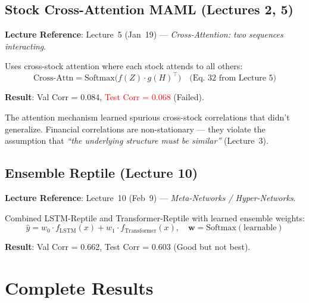 \documentclass[11pt,a4paper]{article}
\begin{document}
\subsection{Stock Cross-Attention MAML \textnormal{(Lectures 2, 5)}}

\textbf{Lecture Reference}: Lecture~5 (Jan~19) --- \emph{Cross-Attention: two sequences interacting}.

Uses cross-stock attention where each stock attends to all others:
\begin{equation}
    \text{Cross-Attn} = \text{Softmax}\bigl(f(Z) \cdot g(H)^\top\bigr) \quad \text{(Eq.~32 from Lecture~5)}
\end{equation}

\textbf{Result}: Val Corr = 0.084, \textcolor{red}{Test Corr = 0.068} (Failed).

The attention mechanism learned spurious cross-stock correlations that didn't generalize. Financial correlations are non-stationary --- they violate the assumption that \emph{``the underlying structure must be similar''} (Lecture~3).

\subsection{Ensemble Reptile \textnormal{(Lecture 10)}}

\textbf{Lecture Reference}: Lecture~10 (Feb~9) --- \emph{Meta-Networks / Hyper-Networks}.

Combined LSTM-Reptile and Transformer-Reptile with learned ensemble weights:
\begin{equation}
    \hat{y} = w_0 \cdot f_{\text{LSTM}}(x) + w_1 \cdot f_{\text{Transformer}}(x), \quad \mathbf{w} = \text{Softmax}(\text{learnable})
\end{equation}

\textbf{Result}: Val Corr = 0.662, Test Corr = 0.603 (Good but not best).

\section{Complete Results}
\end{document}
